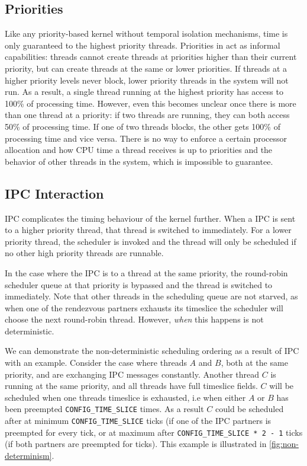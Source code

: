 \subsection{Priorities}

Like any priority-based kernel without temporal isolation mechanisms, time is only guaranteed to the highest priority threads.
Priorities in \selfour act as informal capabilities: threads cannot create threads at priorities higher than their current priority, but can create threads at the same or lower priorities.
If threads at a higher priority levels never block, lower priority threads in the system will not run.
As a result, a single thread running at the highest priority has access to 100\% of processing time.
However, even this becomes unclear once there is more than one thread at a priority: if two threads are running, they can both access 50\% of processing time.
If one of two threads blocks, the other gets 100\% of processing time and vice versa.
There is no way to enforce a certain processor allocation and how CPU time a thread receives is up to priorities and the behavior of other threads in the system, which is impossible to guarantee.

\subsection{IPC Interaction}

\gls{IPC} complicates the timing behaviour of the kernel further.
When a \gls{IPC} is sent to a higher priority thread, that thread is switched to immediately.
For a lower priority thread, the scheduler is invoked and the thread will only be scheduled if no other high priority threads are runnable.

In the case where the \gls{IPC} is to a thread at the same priority, the round-robin scheduler queue at that priority is bypassed and the thread is switched to immediately.
Note that other threads in the scheduling queue are not starved, as when one of the rendezvous partners exhausts its timeslice the scheduler will choose the next round-robin thread.
However, \textit{when} this happens is not deterministic.

We can demonstrate the non-deterministic scheduling ordering as a result of IPC with an example.
Consider the case where threads $A$ and $B$, both at the same priority, and are exchanging IPC messages constantly.
Another thread $C$ is running at the same priority, and all threads have full timeslice fields.
$C$ will be scheduled when one threads timeslice is exhausted, i.e when either $A$ or $B$ has been preempted \texttt{CONFIG\_TIME\_SLICE} times.
As a result $C$ could be scheduled after at minimum \texttt{CONFIG\_TIME\_SLICE} ticks (if one of the \gls{IPC} partners is preempted for every tick, or at maximum after \texttt{CONFIG\_TIME\_SLICE * 2 - 1} ticks (if both partners are preempted for ticks).
This example is illustrated in \cref{fig:non-determinism}.

